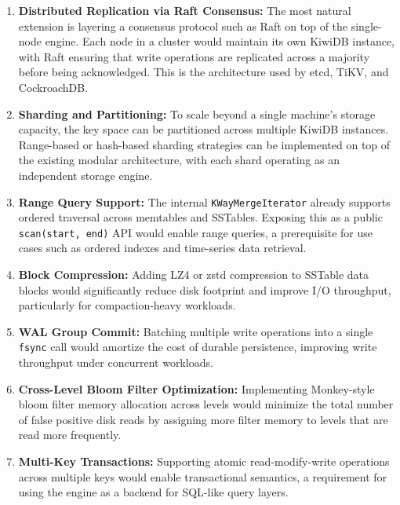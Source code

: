 \documentclass[oneside,a4paper,12pt]{book}
\begin{document}
\begin{enumerate}[leftmargin=2em]
    \item \textbf{Distributed Replication via Raft Consensus:} The most natural extension is layering a consensus protocol such as Raft on top of the single-node engine. Each node in a cluster would maintain its own KiwiDB instance, with Raft ensuring that write operations are replicated across a majority before being acknowledged. This is the architecture used by etcd, TiKV, and CockroachDB.

    \item \textbf{Sharding and Partitioning:} To scale beyond a single machine's storage capacity, the key space can be partitioned across multiple KiwiDB instances. Range-based or hash-based sharding strategies can be implemented on top of the existing modular architecture, with each shard operating as an independent storage engine.

    \item \textbf{Range Query Support:} The internal \texttt{KWayMergeIterator} already supports ordered traversal across memtables and SSTables. Exposing this as a public \texttt{scan(start, end)} API would enable range queries, a prerequisite for use cases such as ordered indexes and time-series data retrieval.

    \item \textbf{Block Compression:} Adding LZ4 or zstd compression to SSTable data blocks would significantly reduce disk footprint and improve I/O throughput, particularly for compaction-heavy workloads.

    \item \textbf{WAL Group Commit:} Batching multiple write operations into a single \texttt{fsync} call would amortize the cost of durable persistence, improving write throughput under concurrent workloads.

    \item \textbf{Cross-Level Bloom Filter Optimization:} Implementing Monkey-style bloom filter memory allocation across levels would minimize the total number of false positive disk reads by assigning more filter memory to levels that are read more frequently.

    \item \textbf{Multi-Key Transactions:} Supporting atomic read-modify-write operations across multiple keys would enable transactional semantics, a requirement for using the engine as a backend for SQL-like query layers.
\end{enumerate}
\end{document}

